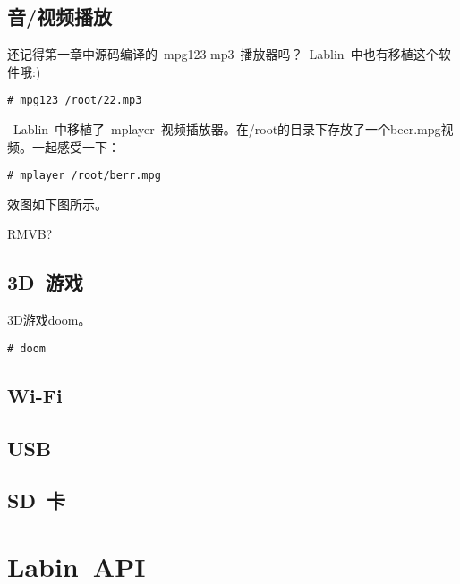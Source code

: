 \documentclass[a4paper,11pt]{article}
\begin{document}
\begin{CJK*}{UTF8}{gbsn}
\subsection{音/视频播放}
还记得第一章中源码编译的~mpg123 mp3~播放器吗？~Lablin~中也有移植这个软件哦:)
\begin{lstlisting}[numbers=none]
# mpg123 /root/22.mp3
\end{lstlisting}

~Lablin~中移植了~mplayer~视频插放器。在/root的目录下存放了一个beer.mpg视频。一起感受一下：
\begin{lstlisting}[numbers=none]
# mplayer /root/berr.mpg
\end{lstlisting}
效图如下图所示。

RMVB?

\subsection{3D~游戏}
3D游戏doom。
\begin{lstlisting}[numbers=none]
# doom
\end{lstlisting}
\subsection{Wi-Fi}
\subsection{USB}
\subsection{SD~卡}

\section{Labin~API}

\ifx \inmaxwitbook \undefined
\end{CJK*}
\end{document}
